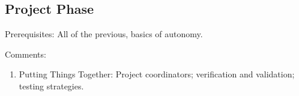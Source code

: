 \documentclass[12pt]{article}
\begin{document}

\subsection{Project Phase}

Prerequisites: All of the previous, basics of autonomy.

Comments: 

\begin{enumerate}

	\item Putting Things Together: Project coordinators; verification and validation; testing strategies. 

\end{enumerate}

\end{document}
